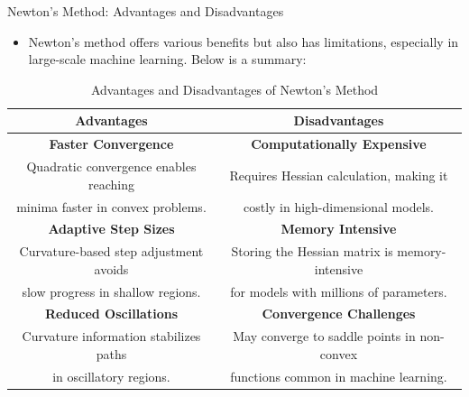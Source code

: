 \documentclass[serif, aspectratio=169]{beamer}
\begin{document}
\begin{frame}{Newton's Method: Advantages and Disadvantages}
    \begin{itemize}
        \item Newton's method offers various benefits but also has limitations, especially in large-scale machine learning. Below is a summary:
    \end{itemize}
    \begin{table}[]
        \centering
        \small %
        \begin{tabular}{|c|c|}
            \hline
            \textbf{Advantages} & \textbf{Disadvantages} \\
            \hline
            \textbf{Faster Convergence} & \textbf{Computationally Expensive} \\
            Quadratic convergence enables reaching & Requires Hessian calculation, making it\\
            minima faster in convex problems. & costly in high-dimensional models. \\
            \hline
            \textbf{Adaptive Step Sizes} & \textbf{Memory Intensive} \\
            Curvature-based step adjustment avoids & Storing the Hessian matrix is memory-intensive\\
            slow progress in shallow regions. & for models with millions of parameters. \\
            \hline
            \textbf{Reduced Oscillations} & \textbf{Convergence Challenges} \\
            Curvature information stabilizes paths & May converge to saddle points in non-convex\\
            in oscillatory regions. & functions common in machine learning. \\
            \hline
        \end{tabular}
        \caption{Advantages and Disadvantages of Newton's Method}
    \end{table}
\end{frame}

%     
\end{document}
